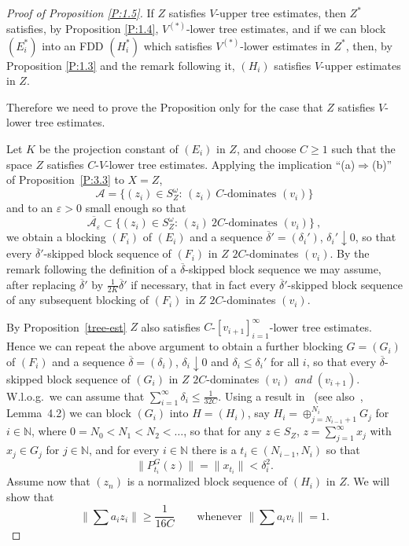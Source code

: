 \documentclass[11pt,leqno]{amsart}
\theoremstyle{definition}
\newcommand{\N}{\mathbb{N}}
\newcommand{\cA}{\mathcal{A}}
\newcommand{\vp}{\varepsilon}
\newcommand{\deltab}{\overline\delta}
\newcommand{\Vs}{V^{(*)}}
\begin{document}
\begin{proof}[Proof of Proposition \ref{P:1.5}]
If $Z$ satisfies $V$-upper tree estimates, then $Z^*$ satisfies, by
Proposition \ref{P:1.4},  $\Vs$-lower tree estimates, and if we can
block $(E^*_i)$ into an FDD $(H^*_i)$ which
 satisfies $\Vs$-lower estimates in $Z^*$,  then,  by Proposition
 \ref{P:1.3} and the remark following it,
 $(H_i)$ satisfies $V$-upper estimates in $Z$.

 Therefore we need to prove the Proposition only for the case that $Z$
 satisfies $V$-lower  tree estimates.

 Let $K$ be the projection constant of $(E_i)$ in $Z$, and choose
 $C\geq 1$ such that the space $Z$ satisfies  $C$-$V$-lower tree
 estimates. Applying the implication ``(a)$\Rightarrow$(b)'' of
 Proposition~\ref{P:3.3} to $X=Z$,
 $$\cA=\Big\{ (z_i)\in S_Z^\omega:\,(z_i)\ C\text{-dominates
 }(v_i)\Big\}$$
 and to an $\vp>0$ small enough so that
 $$\overline{\cA_\vp}\subset\Big\{ (z_i)\in S_Z^\omega:\, (z_i)\
 2C\text{-dominates }(v_i)\Big\}\ ,$$
 we obtain a blocking $(F_i)$ of $(E_i)$  and a sequence
 $\deltab'=(\delta_i')$, $\delta_i'\downarrow 0$, so that
 every $\deltab'$-skipped block sequence of $(F_i)$ in $Z$
 $2C$-dominates $(v_i)$. By the remark following the definition of a
 $\deltab$-skipped block sequence we may assume, after replacing
 $\deltab'$ by $\frac1{2K}\deltab'$ if necessary, that in fact every
 $\deltab'$-skipped block sequence of any subsequent blocking of
 $(F_i)$ in $Z$ $2C$-dominates $(v_i)$.

 By Proposition~\ref{tree-est} $Z$ also
 satisfies $C$-$[v_{i+1}]_{i=1}^{\infty}$-lower tree estimates. Hence we
 can repeat the above argument to obtain a further blocking $G=(G_i)$
 of $(F_i)$ and a sequence $\deltab=(\delta_i)$, $\delta_i\downarrow 0$
 and $\delta_i\leq
 \delta_i'$ for all $i$, so that every $\deltab$-skipped block
 sequence of $(G_i)$ in $Z$ $2C$-dominates $(v_i)$
 \emph{and}
 $(v_{i+1})$. W.l.o.g.~we can assume that
 $\sum_{i=1}^\infty\delta_i\le \frac1{32C}$.
 Using a result in~\cite{J} (see also~\cite{KOS}, Lemma~4.2) we can block
 $(G_i)$ into $H=(H_i)$, say $H_i=\oplus_{j=N_{i-1}+1}^{N_i} G_j$ for
 $i\in\N$, where $0=N_0<N_1<N_2<\ldots$, so that
 for any $z\in S_Z$, $z=\sum_{j=1}^\infty x_j$ with $x_j\in G_j$ for $j\in\N$,
 and for every $i\in\N$ there is a $t_i\in(N_{i-1},N_i)$ so that
 $$\|P^G_{t_i}(z)\|=\|x_{t_i}\|<\delta_i^2.$$
 Assume now that $(z_n)$ is a normalized block sequence of $(H_i)$ in $Z$.
 We will show that
 $$\Big\|\sum a_i z_i\Big\|\ge \frac1{16C}\qquad
 \text{whenever }\Big\|\sum a_i v_i\Big\|=1.$$
 

\end{proof}
\end{document}
